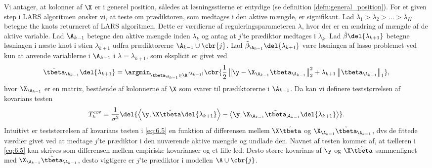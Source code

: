 Vi antager, at kolonner af \(\X\) er i generel position, således at løsningsstierne er entydige (se definition \ref{defn:general_position}).
%
For et given step i LARS algoritmen ønsker vi, at teste om prædiktoren, som medtages i den aktive mængde, er signifikant.
Lad \(\lambda_1 > \lambda_2 > \ldots > \lambda_K\) betegne the knots returneret af LARS algoritmen.
Dette er værdierne af reguleringsparameteren \(\lambda\), hvor der er en ændring af mængde af de aktive variable.
Lad \(\A_{k-1}\) betegne den aktive mængde inden \(\lambda_k\) og antag at \(j\)'te prædiktor medtages i \(\lambda_k\).
Lad \(\hat{\beta} \del{\lambda_{k+1}}\) betegne løsningen i næste knot i stien \(\lambda_{k+1}\) udfra prædiktorerne \(\A_{k-1} \cup \cbr{j}\).
Lad \(\tilde{\beta}_{\A_{k-1}} \del{\lambda_{k+1}}\) være løsningen af lasso problemet ved kun at anvende variablerne i \(\A_{k-1}\) i \(\lambda = \lambda_{k+1}\), som eksplicit er givet ved 
%
\begin{align*}
\tilde{\tbeta}_{\A_{k-1}} \del{\lambda_{k+1}} = \argmin_{\tbeta_{\A_{k-1}} \in \R^{\vert \A_{k-1} \vert}} \cbr{\frac{1}{2} \left\Vert \y - \X_{\A_{k-1}} \tbeta_{\A_{k-1}} \right\Vert_2^2 + \lambda_{k+1} \left\Vert \tbeta_{\A_{k-1}} \right\Vert_1},
\end{align*}
hvor \(\X_{\A_{k-1}}\) er en matrix, bestående af kolonnerne af \(\X\) som svarer til prædiktorerne i \(\A_{k-1}\).
Da kan vi definere teststørrelsen af kovarians testen
\begin{align}
T_k^\text{cov} = \frac{1}{\sigma^2} \del{ \left\langle \y, \X \hat{\tbeta} \del{\lambda_{k+1}} \right\rangle - \left\langle  \y, \X_{\A_{k-1}} \tilde{\tbeta}_{\mathcal{A}_{k-1}} \del{\lambda_{k+1}} \right\rangle}. \label{eq:6.5}
\end{align}
Intuitivt er teststørrelsen af kovarians testen i \eqref{eq:6.5} en funktion af differensen mellem \(\X \hat{\tbeta}\) og \(\X_{\A_{k-1}} \tilde{\tbeta}_{\A_{k-1}}\), dvs de fittede værdier givet ved at medtage \(j\)'te prædiktor i den nuværende aktive mængde og undlade den.
Navnet af testen kommer af, at tælleren i \eqref{eq:6.5} kan skrives som differensen mellem empiriske kovarianser og et lille led.
Desto større kovarians af \(\y\) og \(\X \hat{\tbeta}\) sammenlignet med \(\X_{\A_{k-1}} \hat{\tbeta}_{\A_{k-1}}\), desto vigtigere er \(j\)'te prædiktor i modellen \(\A \cup \cbr{j}\).

